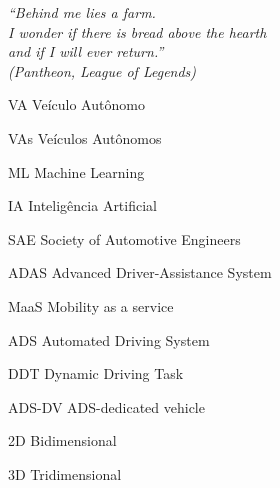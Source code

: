 \documentclass[
	12pt,				%
	openany, %
	a4paper,			%
	english,			%
	french,				%
	spanish,			%
	brazil				%
	]{abntex2}
\let\cleardoublepage\clearpage %
\begin{document}



\begin{epigrafe}
	\vspace*{\fill}
	\begin{flushright}
		\textit{``Behind me lies a farm. \\
			I wonder if there is bread above the hearth \\
			and if I will ever return.'' \\
			(Pantheon, League of Legends)}
	\end{flushright}
\end{epigrafe}





\listoffigures*
\cleardoublepage




\begin{siglas} \label{eq:1}
	\item[VA] Veículo Autônomo 
	\item[VAs] Veículos Autônomos
	\item[ML] Machine Learning
	\item[IA] Inteligência Artificial
	\item[SAE] Society of Automotive Engineers
	\item[ADAS] Advanced Driver-Assistance System
	\item[MaaS] Mobility as a service
	\item[ADS] Automated Driving System
	\item[DDT] Dynamic Driving Task
	\item[ADS-DV] ADS-dedicated vehicle
	\item[2D] Bidimensional
	\item[3D] Tridimensional
\end{siglas}
\end{document}
